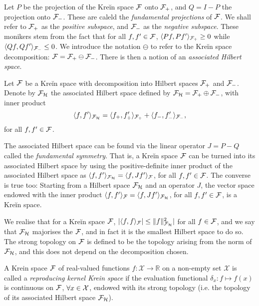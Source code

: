 Let $P$ be the projection of the Kreĭn space ${\mathcal F}$ onto ${\mathcal F}_+$, and $Q=I-P$ the projection onto ${\mathcal F}_-$.
These are caleld the \emph{fundamental projections} of ${\mathcal F}$.
We shall refer to ${\mathcal F}_+$ as the \emph{positive subspace}, and ${\mathcal F}_-$ as the \emph{negative subspace}.
These monikers stem from the fact that for all $f,f' \in {\mathcal F}$, $\langle Pf,Pf'\rangle_{{\mathcal F}_+} \geq 0$ while $\langle Qf,Qf'\rangle_{{\mathcal F}_-} \leq 0$.
We introduce the notation $\ominus$ to refer to the Kreĭn space decomposition: ${\mathcal F} = {\mathcal F}_+ \ominus {\mathcal F}_-$.
There is then a notion of an \emph{associated Hilbert space}.

\begin{definition}
  Let ${\mathcal F}$ be a Kreĭn space with decomposition into Hilbert spaces ${\mathcal F}_+$ and ${\mathcal F}_-$.
  Denote by ${\mathcal F}_{\mathcal H}$ the associated Hilbert space defined by ${\mathcal F}_{\mathcal H} = {\mathcal F}_+ \oplus {\mathcal F}_-$, with inner product 
  \[
    \langle f,f'\rangle_{{\mathcal F}_{\mathcal H}} = \langle f_+,f_+'\rangle_{{\mathcal F}_+} + \langle f_-,f_-'\rangle_{{\mathcal F}_-},
  \]
  for all $f,f'\in{\mathcal F}$.
\end{definition}

The associated Hilbert space can be found via the linear operator $J = P - Q$ called the \emph{fundamental symmetry}.
That is, a Kreĭn space ${\mathcal F}$ can be turned into its associated Hilbert space by using the positive-definite inner product of the associated Hilbert space as $\langle f,f'\rangle_{{\mathcal F}_{\mathcal H}} = \langle f,Jf'\rangle_{\mathcal F}$, for all $f,f'\in{\mathcal F}$.
The converse is true too: Starting from a Hilbert space ${\mathcal F}_{\mathcal H}$ and an operator $J$, the vector space endowed with the inner product $\langle f,f'\rangle_{\mathcal F} = \langle f,Jf'\rangle_{{\mathcal F}_{\mathcal H}}$, for all $f,f'\in{\mathcal F}$, is a Kreĭn space.

We realise that for a Kreĭn space ${\mathcal F}$, $|\langle f,f\rangle_{\mathcal F}| \leq \lVert f\rVert^2_{{\mathcal F}_{\mathcal H}}|$ for all $f\in{\mathcal F}$, and we say that ${\mathcal F}_{\mathcal H}$ majorises the ${\mathcal F}$, and in fact it is the smallest Hilbert space to do so.
The strong topology on ${\mathcal F}$ is defined to be the topology arising from the norm of ${\mathcal F}_{\mathcal H}$, and this does not depend on the decomposition chosen.

\begin{definition}
  A Krein space ${\mathcal F}$ of real-valued functions $f:\mathcal X \rightarrow \mathbb R$ on a non-empty set $\mathcal X$ is called a \emph{reproducing kernel Krein space} if the evaluation functional $\delta_x: f \mapsto f(x)$ is continuous on ${\mathcal F}$, $\forall x \in {\mathcal X}$, endowed with its strong topology (i.e. the topology of its associated Hilbert space ${\mathcal F}_{\mathcal H}$).
\end{definition}

